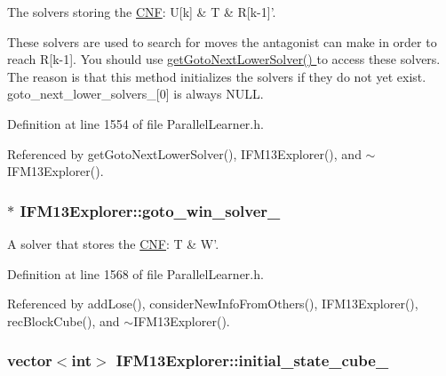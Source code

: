 The solvers storing the \hyperlink{classCNF}{C\-N\-F}\-: U\mbox{[}k\mbox{]} \& T \& R\mbox{[}k-\/1\mbox{]}'. 

These solvers are used to search for moves the antagonist can make in order to reach R\mbox{[}k-\/1\mbox{]}. You should use \hyperlink{classIFM13Explorer_abdf350f2df8a77579df3da7ecb3de8e4}{get\-Goto\-Next\-Lower\-Solver() } to access these solvers. The reason is that this method initializes the solvers if they do not yet exist. goto\-\_\-next\-\_\-lower\-\_\-solvers\-\_\-\mbox{[}0\mbox{]} is always N\-U\-L\-L. 

Definition at line 1554 of file Parallel\-Learner.\-h.



Referenced by get\-Goto\-Next\-Lower\-Solver(), I\-F\-M13\-Explorer(), and $\sim$\-I\-F\-M13\-Explorer().

\hypertarget{classIFM13Explorer_acfe8f5c31b916cf5a6973069c522ef94}{
\subsubsection[{goto\-\_\-win\-\_\-solver\-\_\-}]{$\ast$ I\-F\-M13\-Explorer\-::goto\-\_\-win\-\_\-solver\-\_\-\hspace{0.3cm}{\ttfamily [protected]}}}\label{classIFM13Explorer_acfe8f5c31b916cf5a6973069c522ef94}


A solver that stores the \hyperlink{classCNF}{C\-N\-F}\-: T \& W'. 



Definition at line 1568 of file Parallel\-Learner.\-h.



Referenced by add\-Lose(), consider\-New\-Info\-From\-Others(), I\-F\-M13\-Explorer(), rec\-Block\-Cube(), and $\sim$\-I\-F\-M13\-Explorer().

\hypertarget{classIFM13Explorer_a8fed8ac3d0dc575f8803878f23df7815}{
\subsubsection[{initial\-\_\-state\-\_\-cube\-\_\-}]{\setlength{\rightskip}{0pt plus 5cm}vector$<$int$>$ I\-F\-M13\-Explorer\-::initial\-\_\-state\-\_\-cube\-\_\-\hspace{0.3cm}{\ttfamily [protected]}}}\label{classIFM13Explorer_a8fed8ac3d0dc575f8803878f23df7815}



